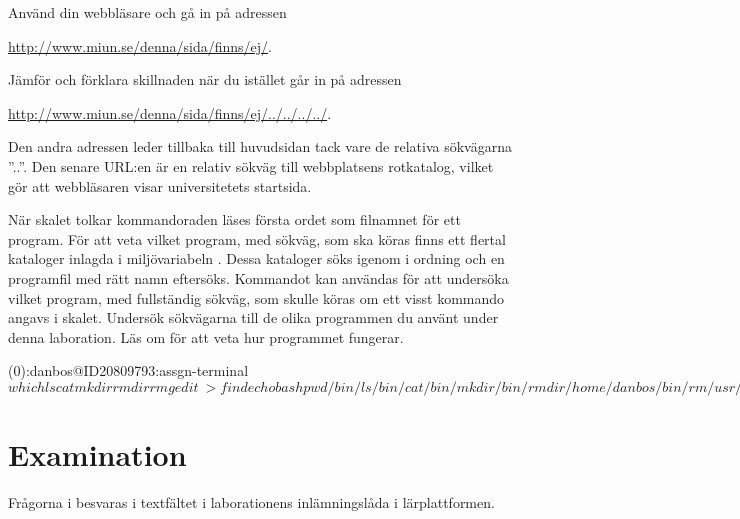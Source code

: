 \documentclass[a4paper]{miunasgn}
\begin{document}
\begin{questions}
  \question\label{q:RelativeWWW}
  Använd din webbläsare och gå in på adressen
  \begin{center}
    \url{http://www.miun.se/denna/sida/finns/ej/}.
  \end{center}
  Jämför och förklara skillnaden när du istället går in på adressen
  \begin{center}
    \url{http://www.miun.se/denna/sida/finns/ej/../../../../}.
  \end{center}
  \begin{solution}
    Den andra adressen leder tillbaka till huvudsidan tack vare de relativa
    sökvägarna ''..''.
    Den senare URL:en är en relativ sökväg till webbplatsens rotkatalog, vilket 
    gör att webbläsaren visar universitetets startsida.
  \end{solution}

  \question\label{q:which}
  När skalet tolkar kommandoraden läses första ordet som filnamnet för ett 
  program.
  För att veta vilket program, med sökväg, som ska köras finns ett flertal 
  kataloger inlagda i miljövariabeln .
  Dessa kataloger söks igenom i ordning och en programfil med rätt namn 
  eftersöks.
  Kommandot  kan användas för att undersöka vilket program, med 
  fullständig sökväg, som skulle köras om ett visst kommando angavs i skalet.
  Undersök sökvägarna till de olika programmen du använt under denna 
  laboration.
  Läs om  för att veta hur programmet fungerar.
  \begin{solution}
    \begin{terminal}
(0):danbos@ID20809793:assgn-terminal$ which ls cat mkdir rmdir rm gedit \
> find echo bash pwd
/bin/ls
/bin/cat
/bin/mkdir
/bin/rmdir
/home/danbos/bin/rm
/usr/bin/gedit
/usr/bin/find
/bin/echo
/bin/bash
/bin/pwd
(0):danbos@ID20809793:assgn-terminal$
    \end{terminal}
  \end{solution}


\end{questions}


\section{Examination}
\label{sec:Examination}
\noindent
Frågorna i  besvaras i textfältet i laborationens 
inlämningslåda i lär\-platt\-formen.


\printbibliography
\end{document}
